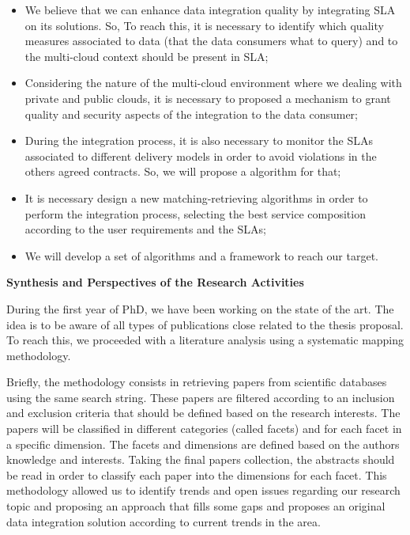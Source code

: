 \documentclass[12pt,a4paper,oneside]{report}
\begin{document}
\begin{itemize}

\item We believe that we can enhance data integration quality by integrating SLA on its solutions. So, To reach this, it is necessary to identify which quality measures associated to data (that the data consumers what to query) and to the multi-cloud context should be present in SLA;

\item Considering the nature of the multi-cloud environment where we dealing with private and public clouds, it is necessary to proposed a mechanism to grant quality and security aspects of the integration to the data consumer;

\item During the integration process, it is also necessary to monitor the SLAs associated to different delivery models in order to avoid violations in the others agreed contracts. So, we will propose a algorithm for that;

\item It is necessary design a new matching-retrieving algorithms in order to perform the integration process, selecting the best service composition according to the user requirements and the SLAs;

\item We will develop a set of algorithms and a framework to reach our target.
\end{itemize}

 
\begin{flushleft}
\textbf{Synthesis and Perspectives of the Research Activities}\\
\end{flushleft}

During the first year of PhD, we have been working on the state of the art. 
The idea is to be aware of all types of publications close related to the thesis proposal. To reach this, we proceeded with a literature analysis using a systematic mapping methodology. 

Briefly, the methodology consists in retrieving papers from scientific databases using the same search string. These papers are filtered according to an inclusion and exclusion criteria that should be defined based on the research interests. The papers will be classified in different categories (called facets) and for each facet in a specific dimension. The facets and dimensions are defined based on the authors knowledge and interests. Taking the final papers collection, the abstracts should be read in order to classify each paper into the dimensions for each facet. 
This methodology allowed us to identify trends and open issues regarding our research topic and proposing an approach that fills some gaps and proposes an original data integration solution according to current trends in the area.
\end{document}
